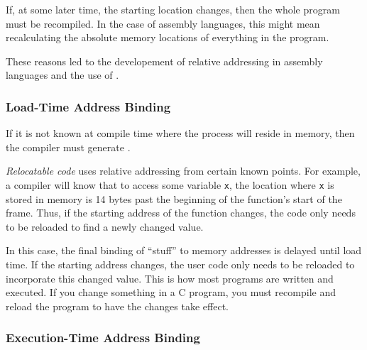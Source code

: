 If, at some later time, the starting location changes, then the whole program must be recompiled.
In the case of assembly languages, this might mean recalculating the absolute memory locations of everything in the program.

These reasons led to the developement of relative addressing in assembly languages and the use of .

\subsubsection{Load-Time Address Binding}\label{subsubsec:Load_Time_Address_Binding}
If it is not known at compile time where the process will reside in memory, then the compiler must generate .

\begin{definition}\label{def:Relocatable_Code}
  \emph{Relocatable code} uses relative addressing from certain known points.
  For example, a compiler will know that to access some variable \texttt{x}, the location where \texttt{x} is stored in memory is 14 bytes past the beginning of the function's start of the frame.
  Thus, if the starting address of the function changes, the code only needs to be reloaded to find a newly changed value.
\end{definition}

In this case, the final binding of ``stuff'' to memory addresses is delayed until load time.
If the starting address changes, the user code only needs to be reloaded to incorporate this changed value.
This is how most programs are written and executed.
If you change something in a C program, you must recompile and reload the program to have the changes take effect.

\subsubsection{Execution-Time Address Binding}\label{subsubsec:Execution_Time_Address_Binding}

